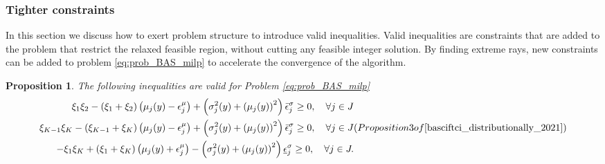 \documentclass[12pt, letterpaper]{article}
\newtheorem{proposition}{Proposition}
\begin{document}
	\subsubsection{Tighter constraints}

	In this section we discuss how to exert problem structure to introduce valid inequalities. Valid inequalities are constraints that are added to the problem that restrict the relaxed feasible region, without cutting any feasible integer solution. By finding extreme rays, new constraints can be added to problem \eqref{eq:prob_BAS_milp} to accelerate the convergence of the algorithm.
	
	\begin{proposition} \label{prop:valid_inequalities}
		The following inequalities are valid for Problem \eqref{eq:prob_BAS_milp}
		\begin{subequations}
			\begin{align}
				\xi_{1} \xi_{2}-\left(\xi_{1}+\xi_{2}\right)\left(\mu_j(y)-\epsilon_j^\mu\right)+\left(\sigma_j^2(y)+\left(\mu_j(y)\right)^2\right) \bar{\epsilon}_j^\sigma \geq 0, \quad \forall j \in J \\
				\xi_{K-1} \xi_{K}-\left(\xi_{K-1}+\xi_{K}\right)\left(\mu_j(y)-\epsilon_j^\mu\right)+\left(\sigma_j^2(y)+\left(\mu_j(y)\right)^2\right) \bar{\epsilon}_j^\sigma \geq 0, \quad \forall j \in J \\
				-\xi_{1} \xi_{K}+\left(\xi_{1}+\xi_{K}\right)\left(\mu_j(y)+\epsilon_j^\mu\right)-\left(\sigma_j^2(y)+\left(\mu_j(y)\right)^2\right) \underline{\epsilon}_j^\sigma \geq 0, \quad \forall j \in J.
			\end{align}
			(Proposition 3 of \cite{basciftci_distributionally_2021})
		\end{subequations}
	\end{proposition}
	
\end{document}
